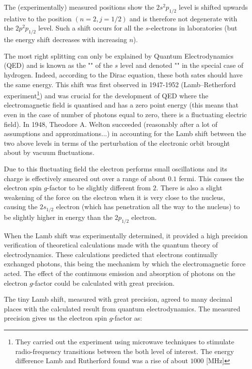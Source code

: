 	The (experimentally) measured positions show the $2s^2p_{1/2}$ level is shifted upwards relative to the position $(n=2,j=1/2)$ and is therefore not degenerate with the $2p^2p_{1/2}$ level. Such a shift occurs for all the $s$-electrons in laboratories (but the energy shift decreases with increasing $n$). 
	
	The most right splitting can only be explained by Quantum Electrodynamics (QED) and is known as the "" of the $s$ level and denoted "" in the special case of hydrogen. Indeed, according to the Dirac equation, these both sates should have the same energy. This shift was first observed in 1947-1952 (Lamb–Retherford experiment\footnote{They carried out the experiment using microwave techniques to stimulate radio-frequency transitions between the both level of interest. The energy difference Lamb and Rutherford found was a rise of about $1000$ [MHz]}) and was crucial for the development of QED where the electromagnetic field is quantised and has a zero point energy (this means that even in the case of number of photons equal to zero, there is a fluctuating electric field). In 1948, Theodore A. Welton succeeded (reasonably after a lot of assumptions and approximations...) in accounting for the Lamb shift between the two above levels in terms of the perturbation of the electronic orbit brought about by vacuum fluctuations.

	Due to this fluctuating field the electron performs small oscillations and its charge is effectively smeared out over a range of about $0.1$ fermi. This causes the electron spin $g$-factor to be slightly different from $2$. There is also a slight weakening of the force on the electron when it is very close to the nucleus, causing the $2s_{1/2}$ electron (which has penetration all the way to the nucleus) to be slightly higher in energy than the $2p_{1/2}$ electron.
		
	When the Lamb shift was experimentally determined, it provided a high precision verification of theoretical calculations made with the quantum theory of electrodynamics. These calculations predicted that electrons continually exchanged photons, this being the mechanism by which the electromagnetic force acted. The effect of the continuous emission and absorption of photons on the electron $g$-factor could be calculated with great precision.

	The tiny Lamb shift, measured with great precision, agreed to many decimal places with the calculated result from quantum electrodynamics. The measured precision gives us the electron spin $g$-factor as:
	
